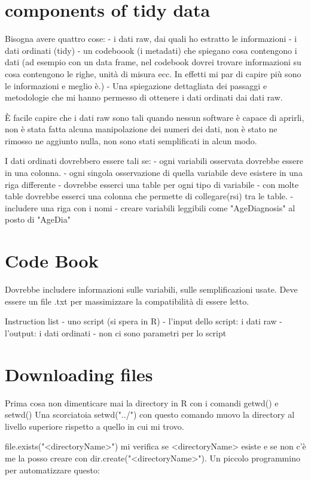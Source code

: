 \section{components of tidy data}

Bisogna avere quattro cose:
- i dati raw, dai quali ho estratto le informazioni
- i dati ordinati (tidy)
- un codeboook (i metadati) che spiegano cosa contengono i dati (ad esempio con un data frame, nel codebook dovrei trovare informazioni su cosa contengono le righe, unità di misura ecc. In effetti mi par di capire più sono le informazioni e meglio è.)
- Una spiegazione dettagliata dei passaggi e metodologie che mi hanno permesso di
ottenere i dati ordinati dai dati raw.

È facile capire che i dati raw sono tali quando nessun software è capace di aprirli, non è stata fatta alcuna manipolazione dei numeri dei dati, non è stato ne rimosso ne aggiunto nulla, non sono stati semplificati in alcun modo.

I dati ordinati dovrebbero essere tali se:
- ogni variabili osservata dovrebbe essere in una colonna.
- ogni singola osservazione di quella variabile deve esistere in una riga differente
- dovrebbe esserci una table per ogni tipo di variabile
- con molte table dovrebbe esserci una colonna che permette di collegare(rsi) tra le table.
- includere una riga con i nomi
- creare variabili leggibili come "AgeDiagnosis" al posto di "AgeDia"

\section{Code Book}
Dovrebbe includere informazioni sulle variabili, sulle semplificazioni usate.
Deve essere un file .txt per massimizzare la compatibilità di essere letto.

Instruction list 
- uno script (si spera in R)
- l'input dello script: i dati raw
- l'output: i dati ordinati
- non ci sono parametri per lo script


\section{Downloading files}

Prima cosa non dimenticare mai la directory in R con i comandi getwd() e setwd()
Una scorciatoia setwd("../") con questo comando muovo la directory al livello superiore
rispetto a quello in cui mi trovo.

file.exists("<directoryName>") mi verifica se <directoryName> esiste e se non c'è me la
posso creare con dir.create("<directoryName>").
Un piccolo programmino per automatizzare questo:

